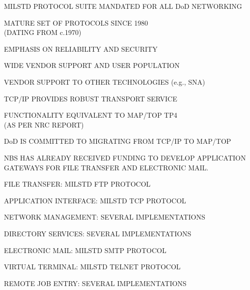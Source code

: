 \begin{bwslide}

\begin	{nrtc}
\item	MILSTD PROTOCOL SUITE MANDATED FOR ALL DoD NETWORKING
	\begin	{nrtc}
	\item	MATURE SET OF PROTOCOLS SINCE 1980\\ (DATING FROM c.1970)
	\item	EMPHASIS ON RELIABILITY AND SECURITY
	\item	WIDE VENDOR SUPPORT AND USER POPULATION
	\item	VENDOR SUPPORT TO OTHER TECHNOLOGIES (e.g., SNA)
	\end	{nrtc}
\item	TCP/IP PROVIDES ROBUST TRANSPORT SERVICE
	\begin	{nrtc}
	\item 	FUNCTIONALITY EQUIVALENT TO MAP/TOP TP4\\ (AS PER NRC REPORT)
	\end	{nrtc}
\item	DoD IS COMMITTED TO MIGRATING FROM TCP/IP TO MAP/TOP
	\begin	{nrtc}
	\item	NBS HAS ALREADY RECEIVED FUNDING TO DEVELOP APPLICATION
		GATEWAYS FOR FILE TRANSFER AND ELECTRONIC MAIL.
	\end	{nrtc}
\end	{nrtc}
\end	{bwslide}

\begin{bwslide}

\begin	{nrtc}
\item	FILE TRANSFER: MILSTD FTP PROTOCOL
\item	APPLICATION INTERFACE: MILSTD TCP PROTOCOL
\item	NETWORK MANAGEMENT: SEVERAL IMPLEMENTATIONS
\item	DIRECTORY SERVICES: SEVERAL IMPLEMENTATIONS
\item	ELECTRONIC MAIL: MILSTD SMTP PROTOCOL
\item	VIRTUAL TERMINAL: MILSTD TELNET PROTOCOL
\item	REMOTE JOB ENTRY: SEVERAL IMPLEMENTATIONS
\end	{nrtc}
\end	{bwslide}

